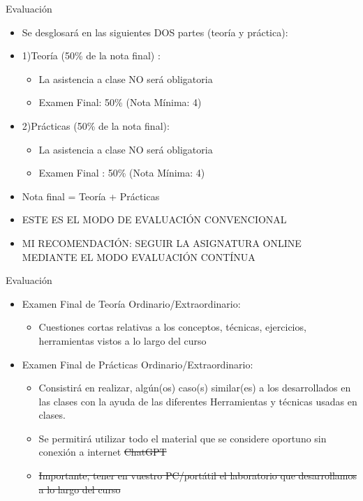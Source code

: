 \documentclass[aspectratio=169,11pt]{beamer}
\begin{document}
\begin{frame}[allowframebreaks]{Evaluación}
\small
\begin{itemize}
  \item Se desglosará en las siguientes DOS partes (teoría y práctica):
  \item 1)Teoría (50\% de la nota final) :
  \begin{itemize}
    \item La asistencia a clase NO será obligatoria
    \item Examen Final: 50\% (Nota Mínima: 4)
  \end{itemize}
  \item 2)Prácticas (50\% de la nota final):
  \begin{itemize}
    \item La asistencia a clase NO será obligatoria
    \item Examen Final : 50\% (Nota Mínima: 4)
  \end{itemize}
  \item Nota final = Teoría + Prácticas
  \item ESTE ES EL MODO DE EVALUACIÓN CONVENCIONAL
  \item MI RECOMENDACIÓN: SEGUIR LA ASIGNATURA ONLINE MEDIANTE EL MODO EVALUACIÓN CONTÍNUA
\end{itemize}
\end{frame}

\begin{frame}[allowframebreaks]{Evaluación}
\small
\begin{itemize}
  \item Examen Final de Teoría Ordinario/Extraordinario:
  \begin{itemize}
    \item Cuestiones cortas relativas a los conceptos, técnicas, ejercicios, herramientas vistos a lo largo del curso
  \end{itemize}
  \item Examen Final de Prácticas Ordinario/Extraordinario:
  \begin{itemize}
    \item Consistirá en realizar, algún(os) caso(s) similar(es) a los desarrollados en las clases con la ayuda de las diferentes Herramientas y técnicas usadas en clases.
    \item Se permitirá utilizar todo el material que se considere oportuno sin conexión a internet \sout{ChatGPT}
    \item \sout{Importante, tener en vuestro PC/portátil el laboratorio que desarrollamos a lo largo del curso}
  \end{itemize}
\end{itemize}
\end{frame}
\end{document}

